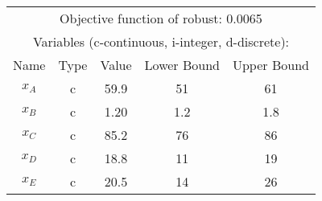 \begin{tabular}{ccccc}
\hline
\multicolumn{5}{c}{Objective function of robust: 0.0065}\\
\multicolumn{5}{c}{Variables (c-continuous, i-integer, d-discrete):} \\
\hline
Name & Type & Value & Lower Bound & Upper Bound \\
\hline \hline
$x_A$ & c & 59.9 & 51 & 61 \\
$x_B$ & c & 1.20 & 1.2 & 1.8 \\ 
$x_C$ & c & 85.2 & 76 & 86 \\
$x_D$ & c & 18.8 & 11 & 19 \\
$x_E$ & c & 20.5 & 14 & 26 \\
\hline
\end{tabular}